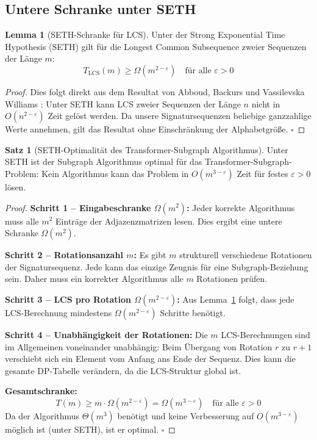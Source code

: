 ﻿\documentclass[a4paper,12pt]{article}
\theoremstyle{definition}
\newtheorem{satz}{Satz}
\newtheorem{lemma}{Lemma}
\begin{document}
\subsection{Untere Schranke unter SETH}

\begin{lemma}[SETH-Schranke für LCS]
\label{lem:seth}
	Unter der Strong Exponential Time Hypothesis (SETH) gilt für die
	Longest Common Subsequence zweier Sequenzen der Länge $m$:
	\[
	T_{\mathrm{LCS}}(m) \geq \Omega(m^{2-\varepsilon}) \quad \text{für alle } \varepsilon > 0
	\]
\end{lemma}

\begin{proof}
	Dies folgt direkt aus dem Resultat von Abboud, Backurs und Vassilevska
	Williams \cite{abboud2015tight}: Unter SETH kann LCS zweier Sequenzen
	der Länge $n$ nicht in $O(n^{2-\varepsilon})$ Zeit gelöst werden.
	Da unsere Signatursequenzen beliebige ganzzahlige Werte annehmen, gilt
	das Resultat ohne Einschränkung der Alphabetgröße. \qquad $\square$
\end{proof}

\begin{satz}[SETH-Optimalität des Transformer-Subgraph Algorithmus]
\label{satz:optimalitaet}
	Unter SETH ist der Subgraph Algorithmus optimal für das
	Transformer-Subgraph-Problem: Kein Algorithmus kann das Problem
	in $O(m^{3-\varepsilon})$ Zeit für festes $\varepsilon > 0$ lösen.
\end{satz}

\begin{proof}
	\textbf{Schritt 1 -- Eingabeschranke $\Omega(m^2)$:}
	Jeder korrekte Algorithmus muss alle $m^2$ Einträge der Adjazenzmatrizen
	lesen. Dies ergibt eine untere Schranke $\Omega(m^2)$.

	\textbf{Schritt 2 -- Rotationsanzahl $m$:}
	Es gibt $m$ strukturell verschiedene Rotationen der Signatursequenz.
	Jede kann das einzige Zeugnis für eine Subgraph-Beziehung sein.
	Daher muss ein korrekter Algorithmus alle $m$ Rotationen prüfen.

	\textbf{Schritt 3 -- LCS pro Rotation $\Omega(m^{2-\varepsilon})$:}
	Aus Lemma~\ref{lem:seth} folgt, dass jede LCS-Berechnung mindestens
	$\Omega(m^{2-\varepsilon})$ Schritte benötigt.

	\textbf{Schritt 4 -- Unabhängigkeit der Rotationen:}
	Die $m$ LCS-Berechnungen sind im Allgemeinen voneinander unabhängig:
	Beim Übergang von Rotation $r$ zu $r+1$ verschiebt sich ein Element
	vom Anfang ans Ende der Sequenz. Dies kann die gesamte DP-Tabelle
	verändern, da die LCS-Struktur global ist.

	\textbf{Gesamtschranke:}
	\[
	T(m) \geq m \cdot \Omega(m^{2-\varepsilon}) = \Omega(m^{3-\varepsilon})
	\quad \text{für alle } \varepsilon > 0
	\]
	Da der Algorithmus $\Theta(m^3)$ benötigt und keine Verbesserung auf
	$O(m^{3-\varepsilon})$ möglich ist (unter SETH), ist er optimal. \qquad $\square$
\end{proof}
\end{document}
